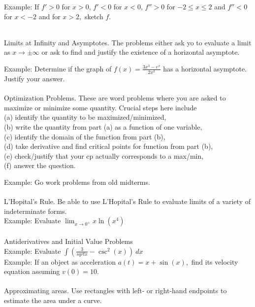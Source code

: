 \documentclass[11pt,fleqn]{article}
\begin{document}
Example: If $f' >0$ for $x>0$, $f' <0$ for $x<0$, $f'' > 0$ for $-2 \leq x \leq 2$ and $f'' < 0$ for $x<-2$ and for $x>2,$ sketch $f.$

\noindent {}\\
Limits at Infinity and Asymptotes. The problems either ask yo to evaluate a limit as $x \to \pm \infty$ or ask to find and justify the existence of a  horizontal asymptote.

Example: Determine if the graph of $f(x)=\frac{3x^3-e^x}{2x^3}$ has a horizontal asymptote. Justify your answer.\\

\noindent {}\\
Optimization Problems. These are word problems where you are asked to maximize or minimize some quantity. Crucial steps here include\\
 (a) identify the quantity to be maximized/minimized, \\
 (b) write the quantity from part (a) as a function of one variable,\\
 (c) identify the domain of the function from part (b), \\
 (d) take derivative and find critical points for function from part (b), \\
 (e) check/justify that your cp actually corresponds to a max/min,\\
 (f) answer the question.
 
 Example: Go work problems from old midterms.\\ 

\noindent {}\\
L'Hopital's Rule. Be able to use L'Hopital's Rule to evaluate limits of a variety of indeterminate forms.\\

Example: Evaluate $\lim_{x \to 0^+} x \ln(x^4)$\\

\noindent {}\\
Antiderivatives and Initial Value Problems \\

Example: Evaluate $\int (\frac{3}{sqrt{x}}-\csc^2(x)) \: dx$\\

Example: If an object as acceleration $a(t) = x + \sin(x),$ find its velocity equation assuming $v(0)=10.$\\


\noindent {}\\
Approximating areas. Use rectangles with left- or right-hand endpoints to estimate the area under a curve.\\ 
\end{document}
